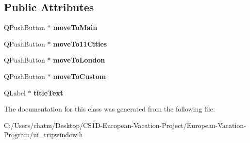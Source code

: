\subsection*{Public Attributes}
\begin{DoxyCompactItemize}
\item 
\mbox{\label{class_ui___trip_window_af9ed0863c361828932fa02423a503929}} 
Q\+Push\+Button $\ast$ {\bfseries move\+To\+Main}
\item 
\mbox{\label{class_ui___trip_window_a19829ebaaefb4342ccde12cf00d2da70}} 
Q\+Push\+Button $\ast$ {\bfseries move\+To11\+Cities}
\item 
\mbox{\label{class_ui___trip_window_aad7407aaada3011e791c80d36847bd71}} 
Q\+Push\+Button $\ast$ {\bfseries move\+To\+London}
\item 
\mbox{\label{class_ui___trip_window_a405a6edc979b22f8745c2fa67e0f28ea}} 
Q\+Push\+Button $\ast$ {\bfseries move\+To\+Custom}
\item 
\mbox{\label{class_ui___trip_window_a45b26400477d661fbb99a67999ac4035}} 
Q\+Label $\ast$ {\bfseries title\+Text}
\end{DoxyCompactItemize}


The documentation for this class was generated from the following file\+:\begin{DoxyCompactItemize}
\item 
C\+:/\+Users/chatm/\+Desktop/\+C\+S1\+D-\/\+European-\/\+Vacation-\/\+Project/\+European-\/\+Vacation-\/\+Program/ui\+\_\+tripwindow.\+h\end{DoxyCompactItemize}
